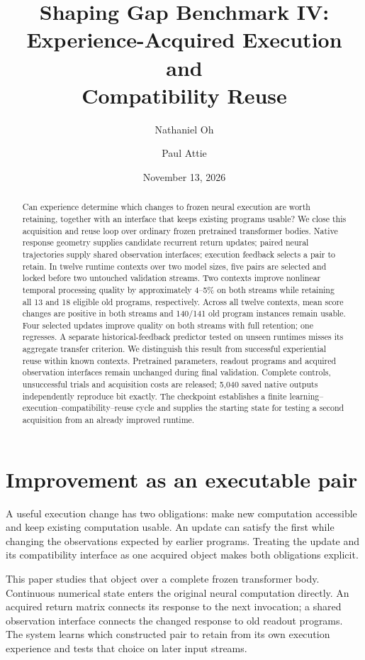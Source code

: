 \documentclass[11pt]{article}
\title{Shaping Gap Benchmark IV:\\Experience-Acquired Execution and\\Compatibility Reuse}
\author{Nathaniel Oh \and Paul Attie}
\date{November 13, 2026}
\begin{document}
\maketitle
\begin{abstract}
Can experience determine which changes to frozen neural execution are worth retaining, together with an interface that keeps existing programs usable? We close this acquisition and reuse loop over ordinary frozen pretrained transformer bodies. Native response geometry supplies candidate recurrent return updates; paired neural trajectories supply shared observation interfaces; execution feedback selects a pair to retain. In twelve runtime contexts over two model sizes, five pairs are selected and locked before two untouched validation streams. Two contexts improve nonlinear temporal processing quality by approximately 4--5\% on both streams while retaining all 13 and 18 eligible old programs, respectively. Across all twelve contexts, mean score changes are positive in both streams and 140/141 old program instances remain usable. Four selected updates improve quality on both streams with full retention; one regresses. A separate historical-feedback predictor tested on unseen runtimes misses its aggregate transfer criterion. We distinguish this result from successful experiential reuse within known contexts. Pretrained parameters, readout programs and acquired observation interfaces remain unchanged during final validation. Complete controls, unsuccessful trials and acquisition costs are released; 5,040 saved native outputs independently reproduce bit exactly. The checkpoint establishes a finite learning--execution--compatibility--reuse cycle and supplies the starting state for testing a second acquisition from an already improved runtime.
\end{abstract}

\section{Improvement as an executable pair}
A useful execution change has two obligations: make new computation accessible and keep existing computation usable. An update can satisfy the first while changing the observations expected by earlier programs. Treating the update and its compatibility interface as one acquired object makes both obligations explicit.

This paper studies that object over a complete frozen transformer body. Continuous numerical state enters the original neural computation directly. An acquired return matrix connects its response to the next invocation; a shared observation interface connects the changed response to old readout programs. The system learns which constructed pair to retain from its own execution experience and tests that choice on later input streams.
\end{document}
